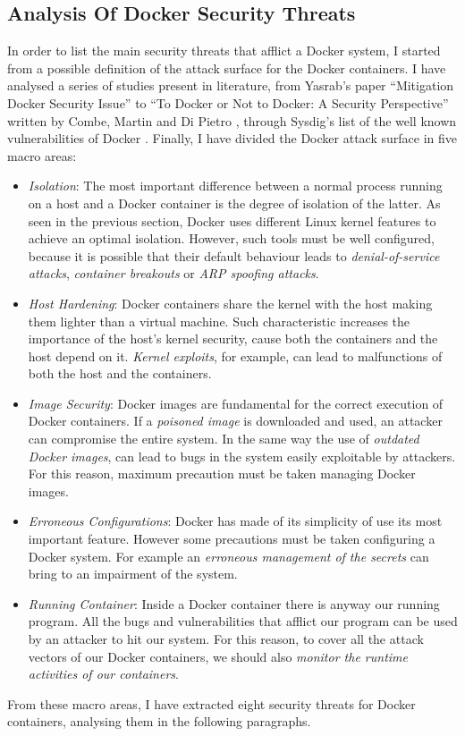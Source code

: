 \documentclass[a4paper,12pt]{article}
\begin{document}
\subsection{Analysis Of Docker Security Threats}

In order to list the main security threats that afflict a Docker system, I
started from a possible definition of the attack surface for the Docker
containers. I have analysed a series of studies present in literature, from
Yasrab's paper ``Mitigation Docker Security
Issue'' \cite{mitigating_docker_security_issues_yasrab} to  ``To Docker or Not to
Docker: A Security Perspective'' written by Combe, Martin and Di
Pietro \cite{to_docker_or_not_to_docker}, through Sysdig's list of the well known
vulnerabilities of Docker \cite{sysdig_docker_vulnerabilities}. Finally, I have
divided the Docker attack surface in five macro areas:
\begin{itemize}
  \item \textit{Isolation}: The most important difference between a normal
  process running on a host and a Docker container is the degree of isolation of
  the latter. As seen in the previous section, Docker uses different Linux
  kernel features to achieve an optimal isolation. However, such tools must be
  well configured, because it is possible that their default behaviour leads to
  \textit{denial-of-service attacks}, \textit{container breakouts} or
  \textit{ARP spoofing attacks}.
  \item \textit{Host Hardening}: Docker containers share the kernel with the
  host making them lighter than a virtual machine. Such characteristic increases
  the importance of the host's kernel security, cause both the containers and
  the host depend on it. \textit{Kernel exploits}, for example, can lead to
  malfunctions of both the host and the containers. 
  \item \textit{Image Security}: Docker images are fundamental for the correct
  execution of Docker containers. If a \textit{poisoned image} is downloaded and
  used, an attacker can compromise the entire system. In the same way the use of
  \textit{outdated Docker images}, can lead to bugs in the system easily
  exploitable by attackers. For this reason, maximum precaution must be taken
  managing Docker images.
  \item \textit{Erroneous Configurations}: Docker has made of its simplicity of
  use its most important feature. However some precautions must be taken
  configuring a Docker system. For example an \textit{erroneous management of
  the secrets} can bring to an impairment of the system. 
  \item \textit{Running Container}: Inside a Docker container there is anyway
  our running program. All the bugs and vulnerabilities that afflict our program
  can be used by an attacker to hit our system. For this reason, to cover all the
  attack vectors of our Docker containers, we should also \textit{monitor the
  runtime activities of our containers}.
\end{itemize}
From these macro areas, I have extracted eight security threats for Docker
containers, analysing them in the following paragraphs.
 
\end{document}
